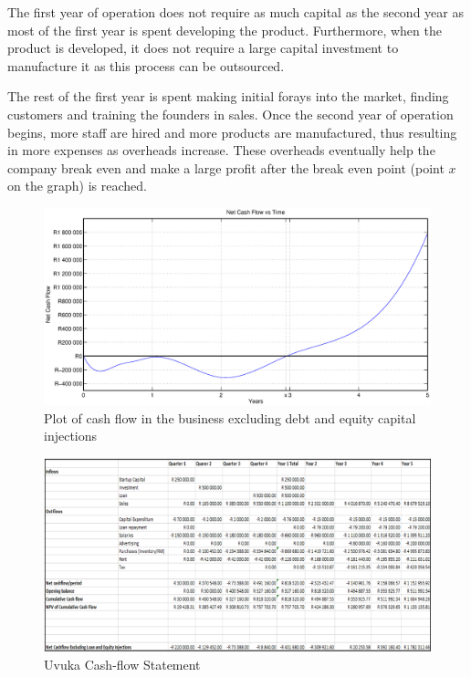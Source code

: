 The first year of operation does not require as much capital as the second year as most of the first year is spent developing the product. Furthermore, when the product is developed, it does not require a large capital investment to manufacture it as this process can be outsourced.

The rest of the first year is spent making initial forays into the market, finding customers and training the founders in sales. Once the second year of operation begins, more staff are hired and more products are manufactured, thus resulting in more expenses as overheads increase. These overheads eventually help the company break even and make a large profit after the break even point (point $x$ on the graph) is reached.

\begin{figure}[H]
\centering
\includegraphics[width=1\textwidth]{images/cashflow_plot}
\vskip10pt
\caption[Cash-flow plot]{Plot of cash flow in the business excluding debt and equity capital injections}
\label{fig:cashflowplot}
\end{figure}

\newpage
\thispagestyle{plain}
\begin{landscape}
  \begin{figure}[p]
    \centering
    \includegraphics[width=1.6\textwidth]{images/CashFlowStatement_horizontal}
    \vskip10pt
    \caption[Uvuka Cash-Flow Statement]{Uvuka Cash-flow Statement}
    \label{fig:CashFlowStatement_horizontal}
  \end{figure}
\end{landscape}
\newpage


